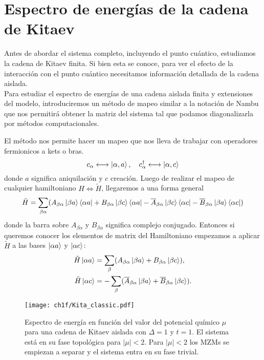\chapter{Espectro de energ\'{i}as de la cadena de Kitaev}
Antes de abordar el sistema completo, incluyendo el punto cu\'{a}ntico, estudiamos la cadena de Kitaev finita. Si bien esta se conoce, para ver el efecto de la interacci\'{o}n con el punto cu\'{a}ntico necesitamos informaci\'{o}n detallada de la cadena aislada.\\
Para estudiar el espectro de energ\'{i}as de una cadena aislada finita y extensiones del modelo, introduciremos un m\'{e}todo de mapeo similar a la notaci\'{o}n de Nambu que nos permitir\'{a} obtener la matriz del sistema tal que podamos diagonalizarla por m\'{e}todos computacionales.

El m\'{e}todo nos permite hacer un mapeo que nos lleva de trabajar con operadores fermionicos a kets o bras. 
\begin{equation}
    c_\alpha \longleftrightarrow \ket{\alpha,a},\quad c_\alpha^\dagger\longleftrightarrow \ket{\alpha,c} 
\end{equation}
donde $a$ significa aniquilaci\'{o}n y $c$ creaci\'{o}n. Luego de realizar el mapeo de cualquier hamiltoniano $H\iff \tilde H$, llegaremos a una forma general
\begin{equation}
    \tilde{H}=\sum_{\beta\alpha} (A_{\beta\alpha} \ket{\beta a}\bra{\alpha a} + B_{\beta\alpha}\ket{\beta c}\bra{\alpha a} - \overline{A}_{\beta\alpha} \ket{\beta c}\bra{\alpha c} - \overline{B}_{\beta\alpha}\ket{\beta a}\bra{\alpha c}) 
\end{equation}
donde la barra sobre $A_{\beta\alpha}$ y $B_{\beta\alpha}$ significa complejo conjugado. Entonces si queremos conocer los elementos de matrix del Hamiltoniano empezamos a aplicar $\tilde{H}$ a las bases $\ket{\alpha a}$ y $\ket{\alpha c}$:
\begin{equation}
    \begin{split}
        \tilde{H}\ket{\alpha a} &= \sum_\beta(A_{\beta\alpha}\ket{\beta a} + B_{\beta\alpha}\ket{\beta c}),
\\
        \tilde{H}\ket{\alpha c} &= - \sum_\beta(\overline{A}_{\beta\alpha}\ket{\beta a} + \overline{B}_{\beta\alpha}\ket{\beta c}).
    \end{split}
    \label{mapeo1}
\end{equation}
%
%
\begin{figure}[th]
    \centering
    \texttt{[image: ch1f/Kita\_classic.pdf]}
    \caption{Espectro de energ\'{i}a en funci\'{o}n del valor del potencial qu\'{i}mico $\mu$ para una cadena de Kitaev aislada con $\Delta=1$ y $t=1$. El sistema est\'{a} en su fase topol\'{o}gica para $|\mu| < 2$. Para $|\mu| < 2$ los MZMs se empiezan a separar y el sistema entra en su fase trivial.}
    \label{fig:kita_clasic}
\end{figure}
